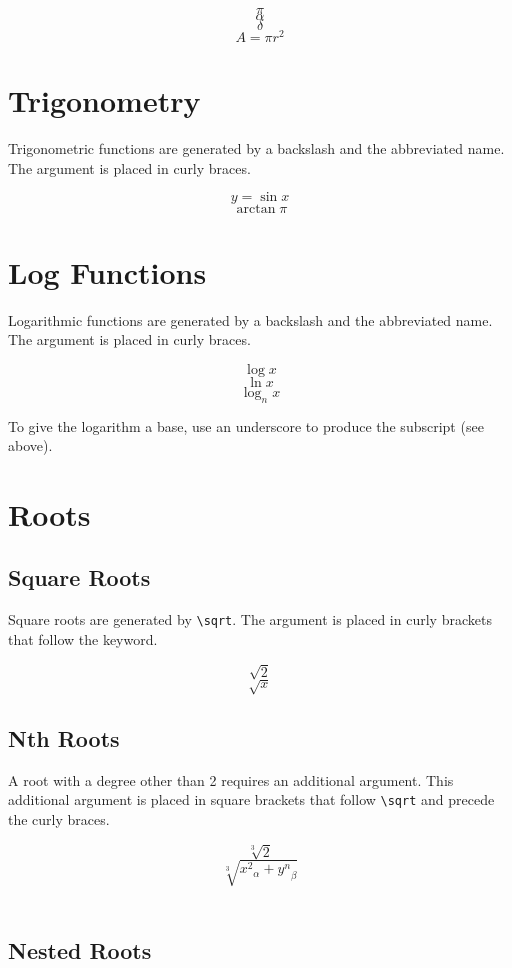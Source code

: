 \documentclass[11pt]{article}
\begin{document}
$$\pi$$
$$\alpha$$
$$\delta$$
$$A=\pi r^2$$

\section{Trigonometry}

Trigonometric functions are generated by a backslash and the abbreviated name. The argument is placed in curly braces.

$$y=\sin{x}$$
$$\arctan{\pi}$$

\section{Log Functions}

Logarithmic functions are generated by a backslash and the abbreviated name. The argument is placed in curly braces.

$$\log{x}$$
$$\ln{x}$$
$$\log_n{x}$$

To give the logarithm a base, use an underscore to produce the subscript (see above).

\section{Roots}

\subsection{Square Roots}

Square roots are generated by \texttt{\textbackslash sqrt}. The argument is placed in curly brackets that follow the keyword.

$$\sqrt{2}$$
$$\sqrt{x}$$

\subsection{Nth Roots}

A root with a degree other than 2 requires an additional argument. This additional argument is placed in square brackets that follow \texttt{\textbackslash sqrt} and precede the curly braces.

$$\sqrt[3]{2}$$
$$\sqrt[3]{{x^2}_\alpha+{y^n}_\beta}$$ \\

\subsection{Nested Roots}
\end{document}
